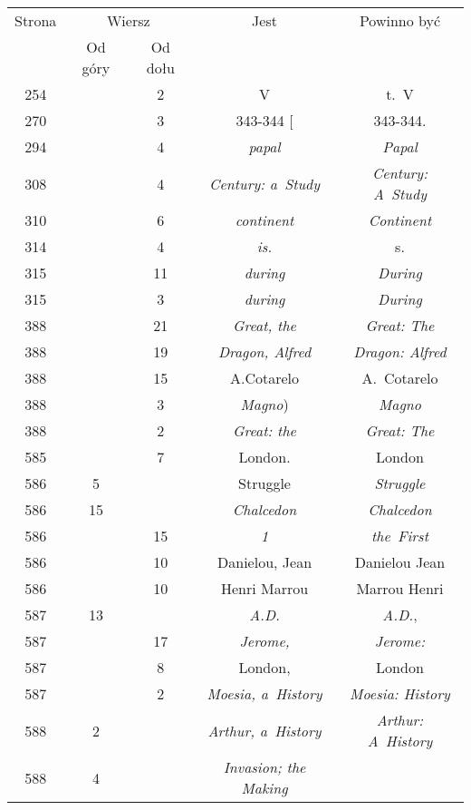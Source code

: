 \documentclass[a4paper,11pt]{article}
\begin{document}
\begin{center}
  \begin{tabular}{|c|c|c|c|c|}
    \hline
    Strona & \multicolumn{2}{c|}{Wiersz} & Jest
                              & Powinno być \\ \cline{2-3}
    & Od góry & Od dołu & & \\
    \hline
    254 & &  2 & V & t.~V \\
    270 & &  3 & 343-344 [ & 343-344. \\
    294 & &  4 & \textit{papal} & \textit{Papal} \\
    308 & &  4 & \textit{Century: a~Study} & \textit{Century: A~Study} \\
    310 & &  6 & \textit{continent} & \textit{Continent} \\
    314 & &  4 & \textit{is.} & s. \\
    315 & & 11 & \textit{during} & \textit{During} \\
    315 & &  3 & \textit{during} & \textit{During} \\
    388 & & 21 & \textit{Great, the} & \textit{Great: The} \\
    388 & & 19 & \textit{Dragon, Alfred} & \textit{Dragon: Alfred} \\
    388 & & 15 & A.Cotarelo & A.~Cotarelo \\
    388 & &  3 & \textit{Magno}) & \textit{Magno} \\
    388 & &  2 & \textit{Great: the} & \textit{Great: The} \\
    585 & &  7 & London. & London \\
    586 &  5 & & Struggle & \textit{Struggle} \\
    586 & 15 & & \textit{Chalcedon} & \textit{Chalcedon} \\
    586 & & 15 & \textit{1} & \textit{the~First} \\
    586 & & 10 & Danielou, Jean & Danielou Jean \\
    586 & & 10 & Henri Marrou & Marrou Henri \\
    587 & 13 & & \textit{A.D.} & \textit{A.D.}, \\
    587 & & 17 & \textit{Jerome,} & \textit{Jerome:} \\
    587 & &  8 & London, & London \\
    587 & &  2 & \textit{Moesia, a~History} & \textit{Moesia: History} \\
    588 &  2 & & \textit{Arthur, a~History} & \textit{Arthur: A~History} \\
    588 &  4 & & \textit{Invasion; the Making}

\end{tabular}
\end{center}
\end{document}
